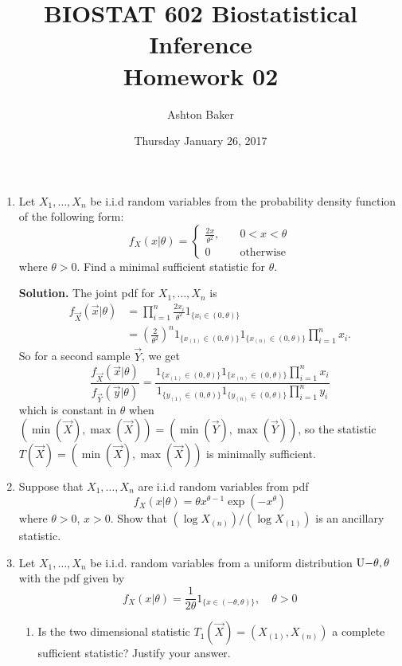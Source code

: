 \documentclass[titlepage]{article}
\begin{document}
\title{BIOSTAT 602 Biostatistical Inference\\Homework 02}
\author{Ashton Baker}
\date{Thursday January 26, 2017}
\maketitle
\begin{enumerate}
\item Let $X_1, \ldots, X_n$ be i.i.d random variables from the probability density function of the following form:
  \[
    f_X(x|\theta) =
    \begin{cases}
      \frac{2x}{\theta^2}, &\quad 0 < x < \theta\\
      0 &\quad \text{otherwise}
    \end{cases}
  \]
  where $\theta > 0$. Find a minimal sufficient statistic for $\theta$.

  \textbf{Solution.} The joint pdf for $X_1, \ldots, X_n$ is
  \[\begin{aligned}
  f_\vec{X}(\vec{x}|\theta) &= \prod_{i=1}^n \frac{2x_i}{\theta^2} 1_{\{x_i \in (0, \theta)\}} \\
  &= \left(\frac{2}{\theta^2}\right)^n 1_{\{x_{(1)} \in (0, \theta)\}} 1_{\{x_{(n)} \in (0, \theta)\}} \prod_{i=1}^n x_i.
  \end{aligned}\]
  So for a second sample $\vec{Y}$, we get
  \[\frac{f_\vec{X}(\vec{x}|\theta)}{f_\vec{Y}(\vec{y}|\theta)} = \frac{1_{\{x_{(1)} \in (0, \theta)\}} 1_{\{x_{(n)} \in (0, \theta)\}} \prod_{i=1}^n x_i}{1_{\{y_{(1)} \in (0, \theta)\}} 1_{\{y_{(n)} \in (0, \theta)\}} \prod_{i=1}^n y_i}\]
  which is constant in $\theta$ when $(\min(\vec{X}), \max(\vec{X})) = (\min(\vec{Y}), \max(\vec{Y}))$, so the statistic $T(\vec{X}) = (\min(\vec{X}), \max(\vec{X}))$ is minimally sufficient.

\item Suppose that $X_1, \ldots, X_n$ are i.i.d random variables from pdf
    \[f_X(x | \theta) = \theta x^{\theta - 1} \exp\left( -x^\theta \right)\]
where $\theta > 0$, $x > 0$. Show that $(\log X_{(n)})/(\log X_{(1)})$ is an ancillary statistic.

\item Let $X_1, \ldots, X_n$ be i.i.d. random variables from a uniform distribution $\text{U}{-\theta, \theta}$ with the pdf given by
\[f_X(x|\theta) = \frac{1}{2\theta}1_{\{x \in (-\theta, \theta)\}}, \quad \theta > 0\]
\begin{enumerate}
\item Is the two dimensional statistic $T_1(\vec{X}) = \left(X_{(1)}, X_{(n)} \right)$ a complete sufficient statistic? Justify your answer.


\end{enumerate}
\end{enumerate}
\end{document}
